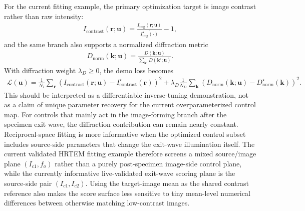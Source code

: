 \documentclass[11pt]{article}
\begin{document}
For the current fitting example, the primary optimization target is image contrast
rather than raw intensity:
\begin{align}
  I_{\mathrm{contrast}}(\mathbf{r};\mathbf{u})
  =
  \frac{I_{\mathrm{img}}(\mathbf{r};\mathbf{u})}
       {\overline{I_{\mathrm{img}}^{\star}(\cdot)}}
  - 1,
\end{align}
and the same branch also supports a normalized diffraction metric
\begin{align}
  D_{\mathrm{norm}}(\mathbf{k};\mathbf{u})
  =
  \frac{D(\mathbf{k};\mathbf{u})}
       {\sum_{\mathbf{k}'} D(\mathbf{k}';\mathbf{u})}.
\end{align}
With diffraction weight \(\lambda_D \ge 0\), the demo loss becomes
\begin{align}
  \mathcal{L}(\mathbf{u})
  =
  \frac{1}{N_I}
  \sum_{\mathbf{r}}
  \left(
    I_{\mathrm{contrast}}(\mathbf{r};\mathbf{u})
    -
    I_{\mathrm{contrast}}^{\star}(\mathbf{r})
  \right)^2
  +
  \lambda_D
  \frac{1}{N_D}
  \sum_{\mathbf{k}}
  \left(
    D_{\mathrm{norm}}(\mathbf{k};\mathbf{u})
    -
    D_{\mathrm{norm}}^{\star}(\mathbf{k})
  \right)^2.
\end{align}
This should be interpreted as a differentiable inverse-tuning demonstration, not as a
claim of unique parameter recovery for the current overparameterized control map.
For controls that mainly act in the image-forming branch after the specimen exit wave,
the diffraction contribution can remain nearly constant.  Reciprocal-space fitting is
more informative when the optimized control subset includes source-side parameters that
change the exit-wave illumination itself.  The current validated HRTEM fitting example
therefore screens a mixed source/image plane \((I_{c1}, f_o)\) rather than a purely
post-specimen image-side control plane, while the currently informative live-validated
exit-wave scoring plane is the source-side pair \((I_{c1}, I_{c2})\).
Using the target-image mean as the shared contrast reference also makes the score
surface less sensitive to tiny mean-level numerical differences between otherwise
matching low-contrast images.
\end{document}
